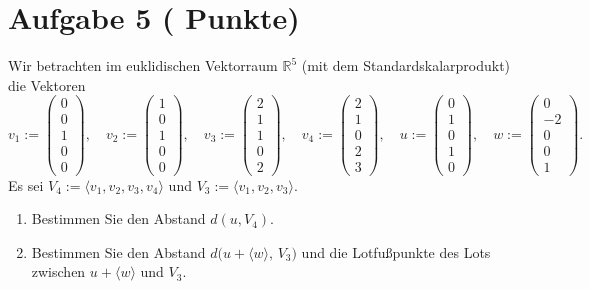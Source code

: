 \documentclass[11pt, a4paper]{article}
\newcommand{\aufgabe}[2]{%
  \section*{\Large\bfseries Aufgabe #1%
  \if\relax\detokenize{#2}\relax\else \hfill\normalfont\normalsize(#2 Punkte)\fi}%
  \vspace{-1.5ex}
}
\begin{document}
\aufgabe{5}{}
Wir betrachten im euklidischen Vektorraum $\mathbb{R}^5$ (mit dem Standardskalarprodukt) die Vektoren
\[
v_1:=\begin{pmatrix}0\\0\\1\\0\\0\end{pmatrix},\quad
v_2:=\begin{pmatrix}1\\0\\1\\0\\0\end{pmatrix},\quad
v_3:=\begin{pmatrix}2\\1\\1\\0\\2\end{pmatrix},\quad
v_4:=\begin{pmatrix}2\\1\\0\\2\\3\end{pmatrix},\quad
u:=\begin{pmatrix}0\\1\\0\\1\\0\end{pmatrix},\quad
w:=\begin{pmatrix}0\\-2\\0\\0\\1\end{pmatrix}.
\]
Es sei $V_4:=\langle v_1,v_2,v_3,v_4\rangle$ und $V_3:=\langle v_1,v_2,v_3\rangle$.
\begin{enumerate}
  \item Bestimmen Sie den Abstand $d(u,V_4)$.
  \begin{framed}\end{framed}

  \item Bestimmen Sie den Abstand $d\bigl(u+\langle w\rangle,\,V_3\bigr)$ und die Lotfußpunkte des Lots zwischen $u+\langle w\rangle$ und $V_3$.
  \begin{framed}\end{framed}
\end{enumerate}
\end{document}
